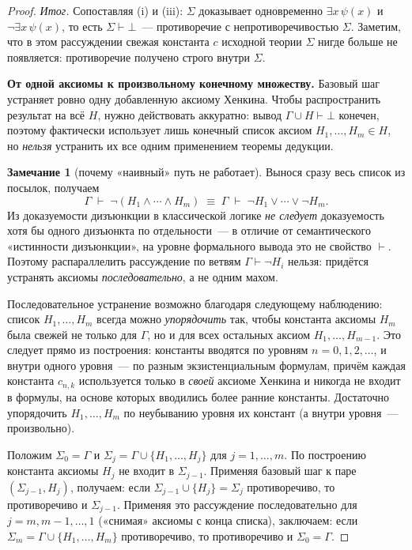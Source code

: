 \documentclass[12pt, a4paper]{article}
\theoremstyle{plain}
\theoremstyle{definition}
\newtheorem{remark}[theorem]{Замечание}
\newcommand{\proves}{\vdash}
\begin{document}
\begin{proof}
\textit{Итог.} Сопоставляя (i) и (iii): $\Sigma$ доказывает одновременно
$\exists x\,\psi(x)$ и $\neg\exists x\,\psi(x)$, то есть $\Sigma \proves \bot$~---
противоречие с непротиворечивостью $\Sigma$. Заметим, что в этом
рассуждении свежая константа $c$ исходной теории $\Sigma$ нигде
больше не появляется: противоречие получено строго внутри $\Sigma$.

\smallskip
\noindent\textbf{От одной аксиомы к произвольному конечному множеству.}
Базовый шаг устраняет ровно одну добавленную аксиому Хенкина. Чтобы
распространить результат на всё $H$, нужно действовать аккуратно: вывод
$\Gamma \cup H \proves \bot$ конечен, поэтому фактически использует лишь
конечный список аксиом $H_1, \ldots, H_m \in H$, но \emph{нельзя}
устранить их все одним применением теоремы дедукции.

\begin{remark}[почему «наивный» путь не работает]
Вынося сразу весь список из посылок, получаем
\[
  \Gamma \;\proves\; \neg(H_1 \wedge \cdots \wedge H_m)
  \;\equiv\;
  \Gamma \;\proves\; \neg H_1 \vee \cdots \vee \neg H_m.
\]
Из доказуемости дизъюнкции в классической логике \emph{не следует}
доказуемость хотя бы одного дизъюнкта по отдельности~--- в отличие от
семантического «истинности дизъюнкции», на уровне формального
вывода это не свойство $\proves$. Поэтому распараллелить рассуждение
по ветвям $\Gamma \proves \neg H_i$ нельзя: придётся устранять аксиомы
\emph{последовательно}, а не одним махом.
\end{remark}

Последовательное устранение возможно благодаря следующему наблюдению:
список $H_1, \ldots, H_m$ всегда можно \emph{упорядочить} так, чтобы
константа аксиомы $H_m$ была свежей не только для $\Gamma$, но и для
всех остальных аксиом $H_1, \ldots, H_{m-1}$. Это следует прямо из
построения: константы вводятся по уровням $n = 0, 1, 2, \ldots$, и
внутри одного уровня~--- по разным экзистенциальным формулам, причём
каждая константа $c_{n,k}$ используется только в \emph{своей} аксиоме
Хенкина и никогда не входит в формулы, на основе которых вводились
более ранние константы. Достаточно упорядочить $H_1,\ldots,H_m$ по
неубыванию уровня их констант (а внутри уровня~--- произвольно).

Положим $\Sigma_0 = \Gamma$ и $\Sigma_j = \Gamma \cup \{H_1,\ldots,H_j\}$
для $j = 1,\ldots,m$. По построению константа аксиомы $H_j$ не входит
в $\Sigma_{j-1}$. Применяя базовый шаг к паре $(\Sigma_{j-1}, H_j)$,
получаем: если $\Sigma_{j-1} \cup \{H_j\} = \Sigma_j$ противоречиво, то
противоречиво и $\Sigma_{j-1}$. Применяя это рассуждение последовательно
для $j = m, m-1, \ldots, 1$ («снимая» аксиомы с конца списка),
заключаем: если $\Sigma_m = \Gamma \cup \{H_1,\ldots,H_m\}$
противоречиво, то противоречиво и $\Sigma_0 = \Gamma$.


\end{proof}
\end{document}
